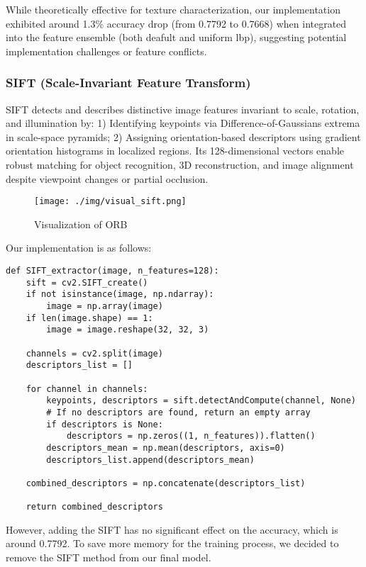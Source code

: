 \documentclass[a4paper,11pt]{article}
\begin{document}
While theoretically effective for texture characterization, our implementation exhibited around 1.3\% accuracy drop (from 0.7792 to 0.7668) when integrated into the feature ensemble (both deafult and uniform lbp), suggesting potential implementation challenges or feature conflicts.

\subsubsection{SIFT (Scale-Invariant Feature Transform)}

SIFT detects and describes distinctive image features invariant to scale, rotation, and illumination by: 1) Identifying keypoints via Difference-of-Gaussians extrema in scale-space pyramids; 2) Assigning orientation-based descriptors using gradient orientation histograms in localized regions. Its 128-dimensional vectors enable robust matching for object recognition, 3D reconstruction, and image alignment despite viewpoint changes or partial occlusion.

\begin{figure}[H]
    \centering
    \texttt{[image: ./img/visual\_sift.png]}
    \caption[visual_hog] {Visualization of ORB}
\end{figure}

Our implementation is as follows:

\begin{verbatim}
def SIFT_extractor(image, n_features=128):
    sift = cv2.SIFT_create()
    if not isinstance(image, np.ndarray):
        image = np.array(image)
    if len(image.shape) == 1:
        image = image.reshape(32, 32, 3) 

    channels = cv2.split(image)
    descriptors_list = []
    
    for channel in channels:
        keypoints, descriptors = sift.detectAndCompute(channel, None)
        # If no descriptors are found, return an empty array
        if descriptors is None:
            descriptors = np.zeros((1, n_features)).flatten()
        descriptors_mean = np.mean(descriptors, axis=0)
        descriptors_list.append(descriptors_mean)
        
    combined_descriptors = np.concatenate(descriptors_list)

    return combined_descriptors
\end{verbatim}

However, adding the SIFT has no significant effect on the accuracy, which is around 0.7792.
To save more memory for the training process, we decided to remove the SIFT method from our final model.
\end{document}
